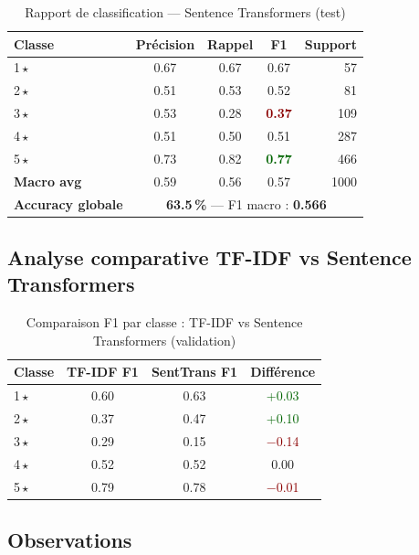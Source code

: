 \documentclass[12pt, a4paper]{article}
\begin{document}
\begin{table}[H]
  \centering
  \begin{tabular}{lcccr}
    \toprule
    \textbf{Classe} & \textbf{Précision} & \textbf{Rappel} & \textbf{F1} & \textbf{Support} \\
    \midrule
    1\,$\star$ & 0.67 & 0.67 & 0.67 &  57 \\
    2\,$\star$ & 0.51 & 0.53 & 0.52 &  81 \\
    3\,$\star$ & 0.53 & 0.28 & \textcolor{darkred}{\textbf{0.37}} & 109 \\
    4\,$\star$ & 0.51 & 0.50 & 0.51 & 287 \\
    5\,$\star$ & 0.73 & 0.82 & \textcolor{darkgreen}{\textbf{0.77}} & 466 \\
    \midrule
    \textbf{Macro avg} & 0.59 & 0.56 & 0.57 & 1000 \\
    \midrule
    \textbf{Accuracy globale} & \multicolumn{4}{c}{\textbf{63.5\,\%} — F1 macro : \textbf{0.566}} \\
    \bottomrule
  \end{tabular}
  \caption{Rapport de classification — Sentence Transformers (test)}
\end{table}

\subsection{Analyse comparative TF-IDF vs Sentence Transformers}

\begin{table}[H]
  \centering
  \begin{tabular}{lccc}
    \toprule
    \textbf{Classe} & \textbf{TF-IDF F1} & \textbf{SentTrans F1} & \textbf{Différence} \\
    \midrule
    1\,$\star$ & 0.60 & 0.63 & \textcolor{darkgreen}{+0.03} \\
    2\,$\star$ & 0.37 & 0.47 & \textcolor{darkgreen}{+0.10} \\
    3\,$\star$ & 0.29 & 0.15 & \textcolor{darkred}{$-$0.14} \\
    4\,$\star$ & 0.52 & 0.52 & 0.00 \\
    5\,$\star$ & 0.79 & 0.78 & \textcolor{darkred}{$-$0.01} \\
    \bottomrule
  \end{tabular}
  \caption{Comparaison F1 par classe : TF-IDF vs Sentence Transformers (validation)}
\end{table}

\subsection{Observations}
\end{document}
